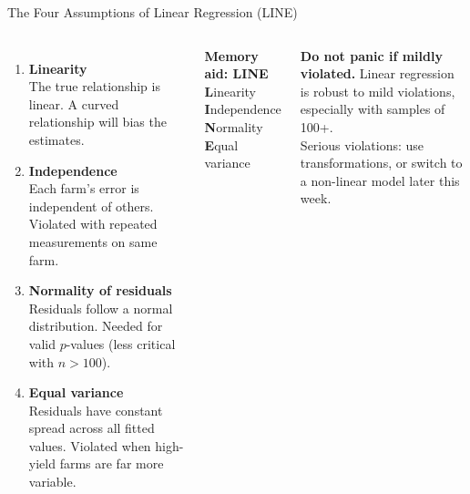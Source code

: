 \documentclass[aspectratio=169,10pt]{beamer}
\begin{document}
\begin{frame}{The Four Assumptions of Linear Regression (LINE)}
  \begin{columns}
      \begin{enumerate}
        \setlength\itemsep{0.35cm}
        \item[\textbf{L}] \textbf{Linearity}\\
              \small The true relationship is linear.
              A curved relationship will bias the estimates.
        \item[\textbf{I}] \textbf{Independence}\\
              \small Each farm's error is independent of others.
              Violated with repeated measurements on same farm.
        \item[\textbf{N}] \textbf{Normality of residuals}\\
              \small Residuals follow a normal distribution.
              Needed for valid $p$-values (less critical with $n>100$).
        \item[\textbf{E}] \textbf{Equal variance}\\
              \small Residuals have constant spread across all fitted values.
              Violated when high-yield farms are far more variable.
      \end{enumerate}
      \begin{tcolorbox}[keybox]
        \textbf{Memory aid: LINE}\\[4pt]
        \small \textbf{L}inearity\\
        \textbf{I}ndependence\\
        \textbf{N}ormality\\
        \textbf{E}qual variance
      \end{tcolorbox}
      \vspace{0.3cm}
      \begin{tcolorbox}[mybox]
        \small\textbf{Do not panic if mildly violated.}
        Linear regression is robust to mild violations, especially
        with samples of 100+.\\[4pt]
        Serious violations: use transformations,
        or switch to a non-linear model later this week.
      \end{tcolorbox}
  \end{columns}
\end{frame}
\end{document}

